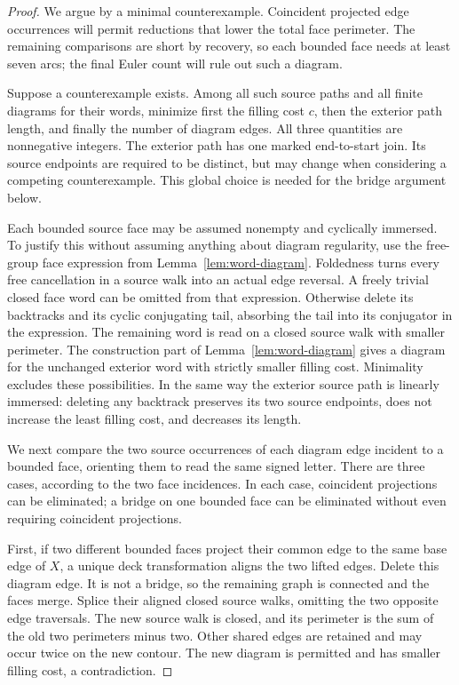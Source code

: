 \begin{proof}
We argue by a minimal counterexample.  Coincident projected edge occurrences
will permit reductions that lower the total face perimeter.  The remaining
comparisons are short by recovery, so each bounded face needs at least seven
arcs; the final Euler count will rule out such a diagram.

Suppose a counterexample exists.  Among all such source paths and all
finite diagrams for their words, minimize first the filling cost $c$,
then the exterior path length, and finally the number of diagram edges.
All three quantities are nonnegative integers.  The exterior path has
one marked end-to-start join.  Its source endpoints are required to be
distinct, but may change when considering a competing counterexample.
This global choice is needed for the bridge argument below.

Each bounded source face may be assumed nonempty and cyclically
immersed.  To justify this without assuming anything about diagram
regularity, use the free-group face expression from
Lemma~\ref{lem:word-diagram}.  Foldedness turns every free cancellation in
a source walk into an actual edge reversal.  A freely trivial closed
face word can be omitted from that expression.  Otherwise delete its
backtracks and its cyclic conjugating tail, absorbing the tail into its
conjugator in the expression.  The remaining word is read on a closed
source walk with smaller perimeter.  The construction part of
Lemma~\ref{lem:word-diagram} gives a diagram for the unchanged exterior
word with strictly smaller filling cost.  Minimality excludes these
possibilities.  In the same way the exterior source path is linearly
immersed: deleting any backtrack preserves its two source endpoints,
does not increase the least filling cost, and decreases its length.

We next compare the two source occurrences of each diagram edge incident
to a bounded face, orienting them to read the same signed letter.  There
are three cases, according to the two face incidences.  In each case,
coincident projections can be eliminated; a bridge on one bounded face
can be eliminated without even requiring coincident projections.

First, if two different bounded faces project their common edge to the
same base edge of $X$, a unique deck transformation aligns the two
lifted edges.  Delete this diagram edge.  It is not a bridge, so the
remaining graph is connected and the faces merge.  Splice their aligned
closed source walks, omitting the two opposite edge traversals.  The
new source walk is closed, and its perimeter is the sum of the old two
perimeters minus two.  Other shared edges are retained and may occur
twice on the new contour.  The new diagram is permitted and has smaller
filling cost, a contradiction.


\end{proof}
